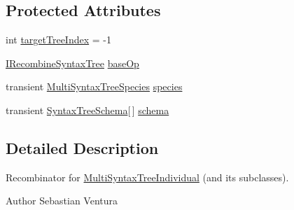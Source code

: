 \subsection*{Protected Attributes}
\begin{DoxyCompactItemize}
\item 
int \hyperlink{classnet_1_1sf_1_1jclec_1_1multisyntaxtree_1_1_multi_syntax_tree_recombinator_a30199d5b39c4b4c4f86a1e7d626a5798}{target\-Tree\-Index} = -\/1
\item 
\hyperlink{interfacenet_1_1sf_1_1jclec_1_1syntaxtree_1_1_i_recombine_syntax_tree}{I\-Recombine\-Syntax\-Tree} \hyperlink{classnet_1_1sf_1_1jclec_1_1multisyntaxtree_1_1_multi_syntax_tree_recombinator_a396d948c7737fb581d398ccbd1515e83}{base\-Op}
\item 
transient \hyperlink{classnet_1_1sf_1_1jclec_1_1multisyntaxtree_1_1_multi_syntax_tree_species}{Multi\-Syntax\-Tree\-Species} \hyperlink{classnet_1_1sf_1_1jclec_1_1multisyntaxtree_1_1_multi_syntax_tree_recombinator_a43f95ba0d2803ec8ce1ff6a7d223a98e}{species}
\item 
transient \hyperlink{classnet_1_1sf_1_1jclec_1_1syntaxtree_1_1_syntax_tree_schema}{Syntax\-Tree\-Schema}\mbox{[}$\,$\mbox{]} \hyperlink{classnet_1_1sf_1_1jclec_1_1multisyntaxtree_1_1_multi_syntax_tree_recombinator_a6590734a82ae7ddb9263ebfaf7613679}{schema}
\end{DoxyCompactItemize}


\subsection{Detailed Description}
Recombinator for \hyperlink{classnet_1_1sf_1_1jclec_1_1multisyntaxtree_1_1_multi_syntax_tree_individual}{Multi\-Syntax\-Tree\-Individual} (and its subclasses).

\begin{DoxyAuthor}{Author}
Sebastian Ventura 
\end{DoxyAuthor}


